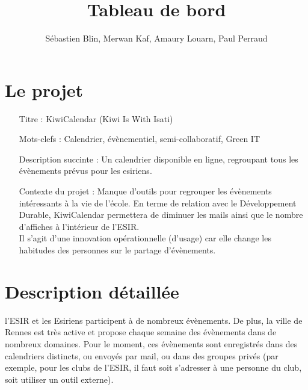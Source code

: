 \documentclass[a4paper,10pt]{article}
\title{Tableau de bord \no 2}
\author{S\'ebastien Blin, Merwan Kaf, Amaury Louarn, Paul Perraud}
\begin{document}
\maketitle

\section{Le projet}
\begin{enumerate}
  \item[Titre :] KiwiCalendar (Kiwi Is With Isati)
  \item[Mots-clefs :] Calendrier, évènementiel, semi-collaboratif, Green IT
  \item[Description succinte :] Un calendrier disponible en ligne, regroupant tous les évènements prévus pour les esiriens.
  \item[Contexte du projet :] Manque d'outils pour regrouper les évènements intéressants à la vie de l'école. En terme de relation avec le Développement Durable, KiwiCalendar permettera de diminuer les mails ainsi que le nombre d'affiches à l'intérieur de l'ESIR.\\
Il s'agit d'une innovation opérationnelle (d'usage) car elle change les habitudes des personnes sur le partage d'évènements.
\end{enumerate}

\section{Description d\'etaill\'ee}
l'ESIR et les Esiriens participent à de nombreux évènements. De plus, la ville de Rennes est très active et propose chaque semaine des évènements dans de nombreux domaines. Pour le moment, ces évènements sont enregistrés dans des calendriers distincts, ou envoyés par mail, ou dans des groupes privés (par exemple, pour les clubs de l'ESIR, il faut soit s'adresser à une personne du club, soit utiliser un outil externe).
\end{document}
